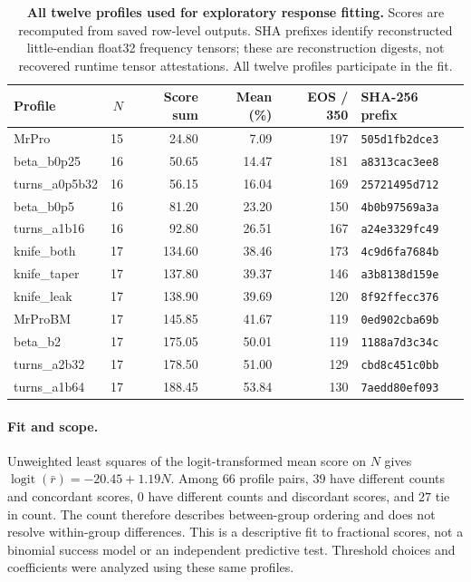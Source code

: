 \begin{table}[ht]
\centering\small
\caption{\textbf{All twelve profiles used for exploratory response fitting.} Scores are recomputed from saved row-level outputs. SHA prefixes identify reconstructed little-endian float32 frequency tensors; these are reconstruction digests, not recovered runtime tensor attestations. All twelve profiles participate in the fit.}
\label{tab:profile-diagnostic}
\begin{tabular}{@{}lrrrrl@{}}
\toprule
Profile & $N$ & Score sum & Mean (\%) & EOS / 350 & SHA-256 prefix \\
\midrule
MrPro & 15 & 24.80 & 7.09 & 197 & \texttt{505d1fb2dce3} \\
beta\_b0p25 & 16 & 50.65 & 14.47 & 181 & \texttt{a8313cac3ee8} \\
turns\_a0p5b32 & 16 & 56.15 & 16.04 & 169 & \texttt{25721495d712} \\
beta\_b0p5 & 16 & 81.20 & 23.20 & 150 & \texttt{4b0b97569a3a} \\
turns\_a1b16 & 16 & 92.80 & 26.51 & 167 & \texttt{a24e3329fc49} \\
knife\_both & 17 & 134.60 & 38.46 & 173 & \texttt{4c9d6fa7684b} \\
knife\_taper & 17 & 137.80 & 39.37 & 146 & \texttt{a3b8138d159e} \\
knife\_leak & 17 & 138.90 & 39.69 & 120 & \texttt{8f92ffecc376} \\
MrProBM & 17 & 145.85 & 41.67 & 119 & \texttt{0ed902cba69b} \\
beta\_b2 & 17 & 175.05 & 50.01 & 119 & \texttt{1188a7d3c34c} \\
turns\_a2b32 & 17 & 178.50 & 51.00 & 129 & \texttt{cbd8c451c0bb} \\
turns\_a1b64 & 17 & 188.45 & 53.84 & 130 & \texttt{7aedd80ef093} \\
\bottomrule
\end{tabular}
\end{table}

\paragraph{Fit and scope.}
Unweighted least squares of the logit-transformed mean score on $N$ gives
$\operatorname{logit}(\bar r)=-20.45+1.19N$. Among $66$ profile pairs, $39$ have different counts and concordant scores, $0$ have different counts and discordant scores, and $27$ tie in count. The count therefore describes between-group ordering and does not resolve within-group differences. This is a descriptive fit to fractional scores, not a binomial success model or an independent predictive test. Threshold choices and coefficients were analyzed using these same profiles. 

